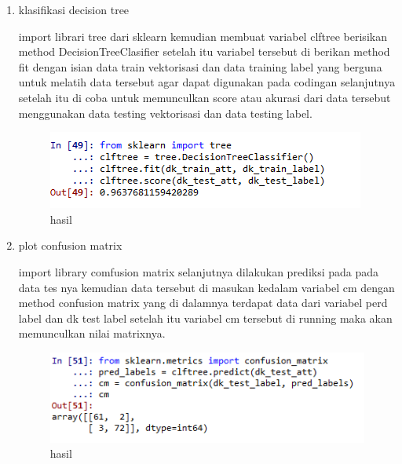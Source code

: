 \begin{enumerate}
\item klasifikasi decision tree

\par import librari tree dari sklearn kemudian membuat variabel clftree berisikan method DecisionTreeClasifier setelah itu variabel tersebut di berikan method fit dengan isian data train vektorisasi dan data training label yang berguna untuk melatih data tersebut agar dapat digunakan pada codingan selanjutnya setelah itu di coba untuk memunculkan score atau akurasi dari data tersebut menggunakan data testing vektorisasi dan data testing label.
\begin{figure}[H]
\centering
\includegraphics[scale=0.7]{figures/1174057/chapter4/10.PNG}
\caption{hasil}
\label{Praktek no 5}
\end{figure}	

\item plot confusion matrix

\par import library comfusion matrix selanjutnya dilakukan prediksi pada pada data tes nya kemudian data tersebut di masukan kedalam variabel cm dengan method confusion matrix yang di dalamnya terdapat data dari variabel perd label dan dk test label setelah itu variabel cm tersebut di running maka akan memunculkan nilai matrixnya. 	
\begin{figure}[H]
\centering
\includegraphics[scale=0.7]{figures/1174057/chapter4/11.PNG}
\caption{hasil}
\label{Praktek no 6}
\end{figure}


\end{enumerate}
